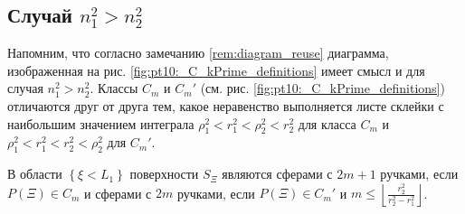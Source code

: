 \subsection{Случай $n_1^2 > n_2^2$}\label{sec:ch5/sec6/sub2}
Напомним, что согласно замечанию \ref{rem:diagram_reuse} диаграмма, изображенная на рис. \ref{fig:pt10:_C_kPrime_definitions} имеет смысл и для  случая $n_1^2 > n_2^2$. Классы $C_m$ и $C_m'$ (см. рис. \ref{fig:pt10:_C_kPrime_definitions}) отличаются друг от друга тем, какое неравенство выполняется листе склейки с наибольшим значением интеграла $\rho_1^2 < r_1^2 < \rho_2^2 < r_2^2$ для класса $C_m$ и $\rho_1^2 < r_1^2 < r_2^2 < \rho_2^2$ для $C_m'$.
\begin{theorem}
В области $\left\{\xi < L_1\right\}$ поверхности $S_\Xi$ являются сферами с $2m+1$ ручками, если $P(\Xi) \in C_m$ и сферами с $2m$ ручками, если $P(\Xi) \in C_m'$ и $m \leq \left\lfloor \frac{r_2^2}{r_2^2-r_1^2} \right\rfloor$. 
\label{th:pt10:th2}
\end{theorem}
